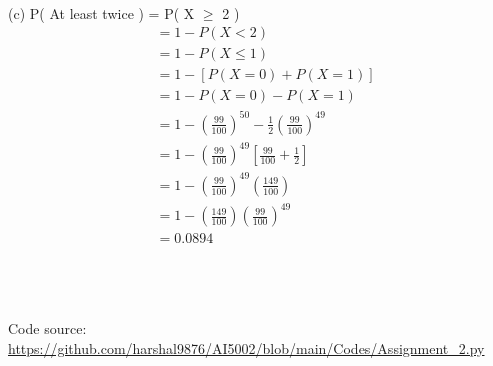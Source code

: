 \documentclass[journal,12pt,twocolumn]{IEEEtran}
\begin{document}
\\
(c) P( At least twice ) = P( X $\geq$ 2 )\\
\begin{align*} 
&= 1-P( X < 2 )\\
&= 1-P( X \leq 1 )\\
&= 1 - [P(X=0) + P(X=1)]\\
&= 1 - P(X=0) - P(X=1)\\
&= 1 - (\frac{99}{100})^{50} -\frac{1}{2}(\frac{99}{100})^{49}\\
&= 1 - (\frac{99}{100})^{49} [\frac{99}{100}+\frac{1}{2}]\\
&= 1 - (\frac{99}{100})^{49}(\frac{149}{100})\\
&= 1 -(\frac{149}{100})(\frac{99}{100})^{49}\\
&= 0.0894
\end{align*}
\\
\\
\\
\begin{tcolorbox}
Code source: \url{https://github.com/harshal9876/AI5002/blob/main/Codes/Assignment_2.py}
\end{tcolorbox}
\end{document}
